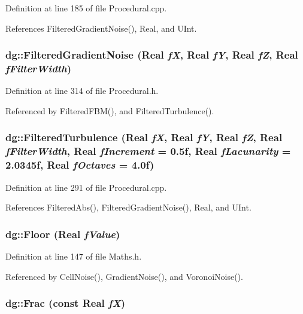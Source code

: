 Definition at line 185 of file Procedural.cpp.

References Filtered\-Gradient\-Noise(), Real, and UInt.
\subsubsection{ dg::Filtered\-Gradient\-Noise ({\bf Real} {\em f\-X}, {\bf Real} {\em f\-Y}, {\bf Real} {\em f\-Z}, {\bf Real} {\em f\-Filter\-Width})\hspace{0.3cm}{\tt  [inline]}}\label{namespacedg_a165}




Definition at line 314 of file Procedural.h.

Referenced by Filtered\-FBM(), and Filtered\-Turbulence().
\subsubsection{ dg::Filtered\-Turbulence ({\bf Real} {\em f\-X}, {\bf Real} {\em f\-Y}, {\bf Real} {\em f\-Z}, {\bf Real} {\em f\-Filter\-Width}, {\bf Real} {\em f\-Increment} = 0.5f, {\bf Real} {\em f\-Lacunarity} = 2.0345f, {\bf Real} {\em f\-Octaves} = 4.0f)}\label{namespacedg_a136}




Definition at line 291 of file Procedural.cpp.

References Filtered\-Abs(), Filtered\-Gradient\-Noise(), Real, and UInt.
\subsubsection{ dg::Floor ({\bf Real} {\em f\-Value})\hspace{0.3cm}{\tt  [inline]}}\label{namespacedg_a94}




Definition at line 147 of file Maths.h.

Referenced by Cell\-Noise(), Gradient\-Noise(), and Voronoi\-Noise().
\subsubsection{ dg::Frac (const {\bf Real} {\em f\-X})\hspace{0.3cm}{\tt  [inline]}}\label{namespacedg_a108}





